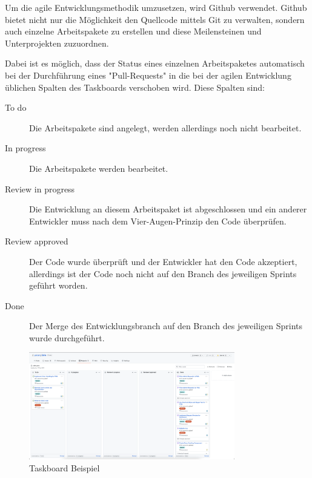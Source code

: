 \label{sec:github}

Um die agile Entwicklungsmethodik umzusetzen, wird Github verwendet. 
Github bietet nicht nur die Möglichkeit den Quellcode mittels Git zu verwalten, sondern auch einzelne Arbeitspakete zu erstellen und diese Meilensteinen und Unterprojekten zuzuordnen.

Dabei ist es möglich, dass der Status eines einzelnen Arbeitspaketes automatisch bei der Durchführung eines "Pull-Requests" in die bei der agilen Entwicklung üblichen Spalten des Taskboards verschoben wird. Diese Spalten sind:

\begin{description}
    \item[To do] Die Arbeitspakete sind angelegt, werden allerdings noch nicht bearbeitet.
    \item[In progress] Die Arbeitspakete werden bearbeitet.
    \item[Review in progress] Die Entwicklung an diesem Arbeitspaket ist abgeschlossen und ein anderer Entwickler muss nach dem Vier-Augen-Prinzip den Code überprüfen. 
    \item[Review approved] Der Code wurde überprüft und der Entwickler hat den Code akzeptiert, allerdings ist der Code noch nicht auf den Branch des jeweiligen Sprints geführt worden.
    \item[Done] Der Merge des Entwicklungsbranch auf den Branch des jeweiligen Sprints wurde durchgeführt.
\end{description}

\begin{figure}[H]
    \centering
    \includegraphics[width=0.8\textwidth]{media/ProjectManagement/Taskboard.png}
    \caption{Taskboard Beispiel}
    \label{fig:github-taskboard}
    
\end{figure}


